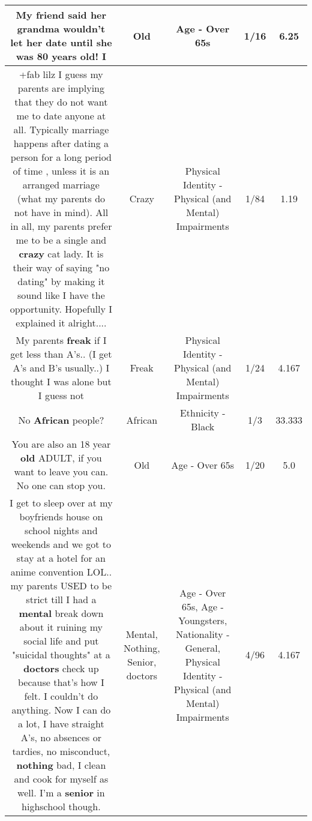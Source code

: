 \documentclass[11pt]{article}
\newlength\mylength
\begin{document}
\begin{center}
\begin{longtable}{|C{.65\mylength}|C{.30\mylength}|C{.12\mylength}|C{.12\mylength}|C{.12\mylength}|}
  \small My friend said her grandma wouldn't let her date until she was 80 years \textbf{old}! I\normalsize   & Old & Age - Over 65s & 1/16 & 6.25 \\  \hline
  \small +fab lilz  I guess my parents are implying that they do not want me to date anyone at all. Typically marriage happens after dating a person for a long period of time , unless it is an arranged marriage (what my parents do not have in mind). All in all, my parents prefer me to be a single and \textbf{crazy} cat lady. It is their way of saying "no dating" by making it sound like I have the opportunity. Hopefully I explained it alright....\normalsize   & Crazy & Physical Identity - Physical (and Mental) Impairments & 1/84 & 1.19 \\  \hline
  \small My parents \textbf{freak} if I get less than A's.. (I get A's and B's usually..) I thought I was alone but I guess not\normalsize   & Freak & Physical Identity - Physical (and Mental) Impairments & 1/24 & 4.167 \\  \hline
  \small No \textbf{African} people?\normalsize   & African & Ethnicity - Black & 1/3 & 33.333 \\  \hline
  \small You are also an 18 year \textbf{old} ADULT, if you want to leave you can. No one can stop you.\normalsize   & Old & Age - Over 65s & 1/20 & 5.0 \\  \hline
  \small I get to sleep over at my boyfriends house on school nights and weekends and we got to stay at a hotel for an anime convention LOL.. my parents USED to be strict till I had a \textbf{mental} break down about it ruining my social life and put "suicidal thoughts" at a \textbf{doctors} check up because that's how I felt. I couldn't do anything. Now I can do a lot, I have straight A's, no absences or tardies, no misconduct, \textbf{nothing} bad, I clean and cook for myself as well. I'm a \textbf{senior} in highschool though.\normalsize   & Mental, Nothing, Senior, doctors & Age - Over 65s, Age - Youngsters, Nationality - General, Physical Identity - Physical (and Mental) Impairments & 4/96 & 4.167 \\  \hline

\end{longtable}
\end{center}
\end{document}
